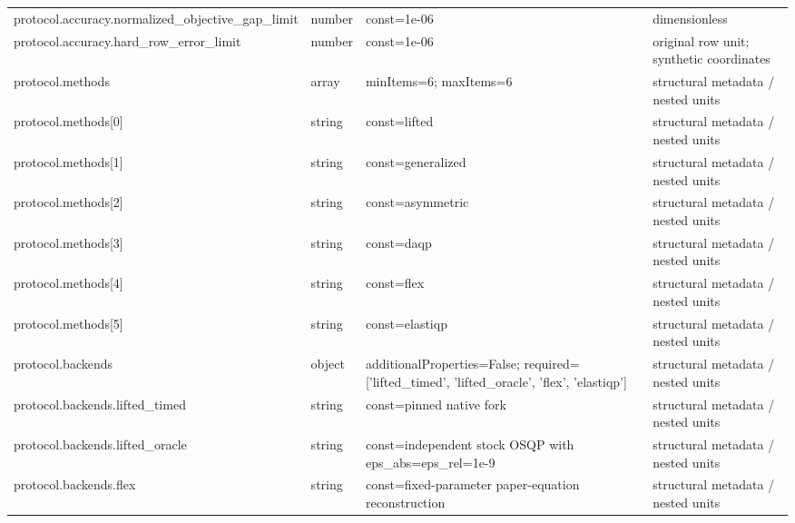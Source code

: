 \begin{longtable}{@{}>{\raggedright\arraybackslash}p{}>{\raggedright\arraybackslash}p{}>{\raggedright\arraybackslash}p{}>{\raggedright\arraybackslash}p{}@{}}
protocol.\allowbreak{}accuracy.\allowbreak{}normalized\_\allowbreak{}objective\_\allowbreak{}gap\_\allowbreak{}limit & number & const=\allowbreak{}1e-06 & dimensionless\\
protocol.\allowbreak{}accuracy.\allowbreak{}hard\_\allowbreak{}row\_\allowbreak{}error\_\allowbreak{}limit & number & const=\allowbreak{}1e-06 & original row unit; synthetic coordinates\\
protocol.\allowbreak{}methods & array & minItems=\allowbreak{}6; maxItems=\allowbreak{}6 & structural metadata /\allowbreak{} nested units\\
protocol.\allowbreak{}methods[0] & string & const=\allowbreak{}lifted & structural metadata /\allowbreak{} nested units\\
protocol.\allowbreak{}methods[1] & string & const=\allowbreak{}generalized & structural metadata /\allowbreak{} nested units\\
protocol.\allowbreak{}methods[2] & string & const=\allowbreak{}asymmetric & structural metadata /\allowbreak{} nested units\\
protocol.\allowbreak{}methods[3] & string & const=\allowbreak{}daqp & structural metadata /\allowbreak{} nested units\\
protocol.\allowbreak{}methods[4] & string & const=\allowbreak{}flex & structural metadata /\allowbreak{} nested units\\
protocol.\allowbreak{}methods[5] & string & const=\allowbreak{}elastiqp & structural metadata /\allowbreak{} nested units\\
protocol.\allowbreak{}backends & object & additionalProperties=\allowbreak{}False; required=\allowbreak{}['lifted\_\allowbreak{}timed', 'lifted\_\allowbreak{}oracle', 'flex', 'elastiqp'] & structural metadata /\allowbreak{} nested units\\
protocol.\allowbreak{}backends.\allowbreak{}lifted\_\allowbreak{}timed & string & const=\allowbreak{}pinned native fork & structural metadata /\allowbreak{} nested units\\
protocol.\allowbreak{}backends.\allowbreak{}lifted\_\allowbreak{}oracle & string & const=\allowbreak{}independent stock OSQP with eps\_\allowbreak{}abs=\allowbreak{}eps\_\allowbreak{}rel=\allowbreak{}1e-9 & structural metadata /\allowbreak{} nested units\\
protocol.\allowbreak{}backends.\allowbreak{}flex & string & const=\allowbreak{}fixed-\allowbreak{}parameter paper-\allowbreak{}equation reconstruction & structural metadata /\allowbreak{} nested units\\

\end{longtable}
